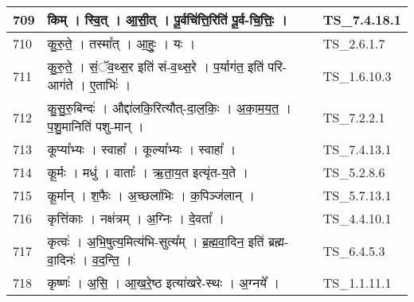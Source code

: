 \documentclass[17pt]{extarticle}
\begin{document}
\begin{longtable}{||p{0.4in}||p{4.9in}||p{0.9in}||}
    \hline
        
    709 & किम्   ।   स्वि॒त्   ।   आ॒सी॒त्   ।   पू॒र्वचि॑त्ति॒रिति॑ पू॒र्व{-}चि॒त्तिः॒   ।    & TS\_7.4.18.1       \\
    
    \hline
        
    710 & कु॒रु॒ते॒   ।   तस्मा᳚त्   ।   आ॒हुः॒   ।   यः   ।    & TS\_2.6.1.7       \\
    
    \hline
        
    711 & कु॒रु॒ते॒   ।   सं॒ॅव॒थ्स॒र इति॑ सं{-}व॒थ्स॒रे   ।   प॒र्याग॑त॒ इति॑ परि{-}आग॑ते   ।   ए॒ताभिः॑   ।    & TS\_1.6.10.3       \\
    
    \hline
        
    712 & कु॒सु॒रु॒बिन्दः॑   ।   औद्दा॑लकि॒रित्यौत्{-}दा॒ल॒किः॒   ।   अ॒का॒म॒य॒त॒   ।   प॒शु॒मानिति॑ पशु{-}मान्   ।    & TS\_7.2.2.1       \\
    
    \hline
        
    713 & कूप्या᳚भ्यः   ।   स्वाहा᳚   ।   कूल्या᳚भ्यः   ।   स्वाहा᳚   ।    & TS\_7.4.13.1       \\
    
    \hline
        
    714 & कू॒र्मः   ।   मधु॑   ।   वाताः᳚   ।   ऋ॒ता॒य॒त इत्यृ॑त{-}य॒ते   ।    & TS\_5.2.8.6       \\
    
    \hline
        
    715 & कू॒र्मान्   ।   श॒फैः   ।   अ॒च्छला॑भिः   ।   क॒पिञ्ज॑लान्   ।    & TS\_5.7.13.1       \\
    
    \hline
        
    716 & कृत्ति॑काः   ।   नक्ष॑त्रम्   ।   अ॒ग्निः   ।   दे॒वता᳚   ।    & TS\_4.4.10.1       \\
    
    \hline
        
    717 & कृत्वः॑   ।   अ॒भि॒षुत्य॒मित्य॑भि{-}सुत्य᳚म्   ।   ब्र॒ह्म॒वा॒दिन॒ इति॑ ब्रह्म{-}वा॒दिनः॑   ।   व॒द॒न्ति॒   ।    & TS\_6.4.5.3       \\
    
    \hline
        
    718 & कृष्णः॑   ।   अ॒सि॒   ।   आ॒ख॒रे॒ष्ठ इत्या॑खरे{-}स्थः   ।   अ॒ग्नये᳚   ।    & TS\_1.1.11.1       \\
    
    \hline
        

\end{longtable}
\end{document}
